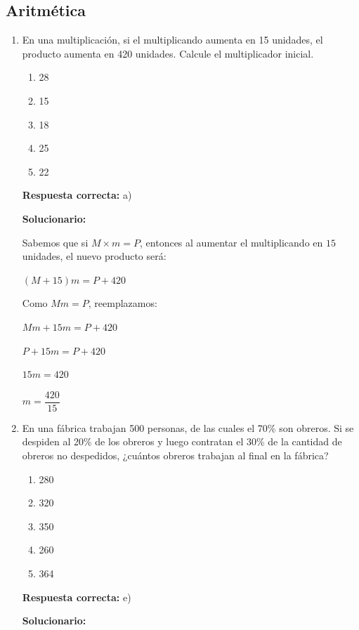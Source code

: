 
\subsection*{Aritmética}

\begin{enumerate}
	
	\item En una multiplicación, si el multiplicando aumenta en 15 unidades, el producto aumenta en 420 unidades. Calcule el multiplicador inicial.
	\begin{enumerate}[label=\alph*)]
		\item 28
		\item 15
		\item 18
		\item 25
		\item 22
	\end{enumerate}
	\textbf{Respuesta correcta:} a)
	
	\vspace{2mm}
	\textbf{Solucionario:}

	Sabemos que si $M\times m=P$, entonces al aumentar el multiplicando en $15$ unidades, el nuevo producto será:
	
	$(M+15)m=P+420$
	
	Como $Mm=P$, reemplazamos:
	
	$Mm+15m=P+420$
	
	$P+15m=P+420$
	
	$15m=420$
	
	$m=\dfrac{420}{15}$
	
	\vspace{6mm}
	
	\item En una fábrica trabajan 500 personas, de las cuales el 70\% son obreros. Si se despiden al 20\% de los obreros y luego contratan el 30\% de la cantidad de obreros no despedidos, ¿cuántos obreros trabajan al final en la fábrica?
	\begin{enumerate}[label=\alph*)]
		\item 280
		\item 320
		\item 350
		\item 260
		\item 364
	\end{enumerate}
	\textbf{Respuesta correcta:} e)
	
	\vspace{2mm}
	\textbf{Solucionario:}
	

\end{enumerate}

